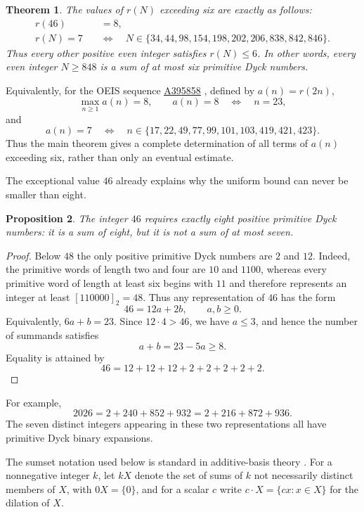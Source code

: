 \documentclass[12pt]{article}
\theoremstyle{plain}
\newtheorem{theorem}{Theorem}
\newtheorem{proposition}[theorem]{Proposition}
\newcommand{\seqnum}[1]{\href{https://oeis.org/#1}{\rm \underline{#1}}}
\begin{document}
\begin{theorem}\label{thm:main}
The values of $r(N)$ exceeding six are exactly as follows:
\[
\begin{aligned}
 r(46)&=8,\\[4pt]
 r(N)=7\quad&\Longleftrightarrow\quad
 N\in\{34,44,98,154,198,202,206,838,842,846\}.
\end{aligned}
\]
Thus every other positive even integer satisfies $r(N)\leq6$.  In other
words, every even integer $N\geq848$ is a sum of at most six primitive
Dyck numbers.
\end{theorem}

Equivalently, for the OEIS sequence \seqnum{A395858}
\cite{OEIS-A395858}, defined by $a(n)=r(2n)$,
\[
        \max_{n\geq1}a(n)=8,
        \qquad
        a(n)=8\quad\Longleftrightarrow\quad n=23,
\]
and
\[
 a(n)=7
 \quad\Longleftrightarrow\quad
 n\in\{17,22,49,77,99,101,103,419,421,423\}.
\]
Thus the main theorem gives a complete determination of all terms of
$a(n)$ exceeding six, rather than only an eventual estimate.

The exceptional value $46$ already explains why the uniform bound can
never be smaller than eight.

\begin{proposition}\label{prop:46}
The integer $46$ requires exactly eight positive primitive Dyck numbers:
it is a sum of eight, but it is not a sum of at most seven.
\end{proposition}

\begin{proof}
Below $48$ the only positive primitive Dyck numbers are $2$ and $12$.
Indeed, the primitive words of length two and four are $10$ and $1100$,
whereas every primitive word of length at least six begins with $11$ and
therefore represents an integer at least $[110000]_2=48$.  Thus any
representation of $46$ has the form
\[
        46=12a+2b,\qquad a,b\geq0.
\]
Equivalently, $6a+b=23$.  Since $12\cdot4>46$, we have $a\leq3$, and
hence the number of summands satisfies
\[
        a+b=23-5a\geq8.
\]
Equality is attained by
\[
        46=12+12+12+2+2+2+2+2.
\]
\end{proof}

For example,
\[
 2026=2+240+852+932=2+216+872+936.
\]
The seven distinct integers appearing in these two representations all
have primitive Dyck binary expansions.

The sumset notation used below is standard in additive-basis theory
\cite[Chap.\ 1]{Nathanson}.  For a nonnegative integer $k$, let $kX$ denote the
set of sums of $k$ not necessarily distinct members of $X$, with
$0X=\{0\}$, and for a scalar $c$ write
$c\cdot X=\{cx:x\in X\}$ for the dilation of $X$.
\end{document}

